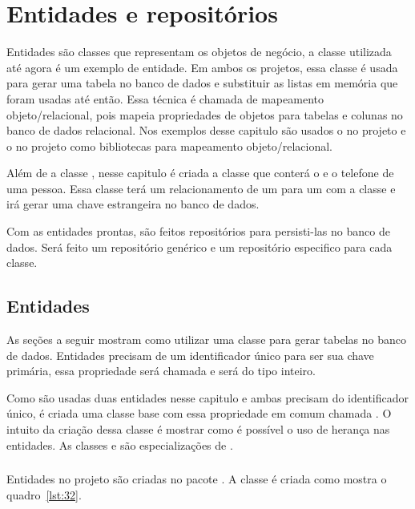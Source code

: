 \chapter{Entidades e repositórios}

Entidades são classes que representam os objetos de negócio, a classe  utilizada até agora é um exemplo de entidade. Em ambos os projetos, essa classe é usada para gerar uma tabela no banco de dados e substituir as listas em memória que foram usadas até então. Essa técnica é chamada de mapeamento objeto/relacional, pois mapeia propriedades de objetos para tabelas e colunas no banco de dados relacional. Nos exemplos desse capitulo são usados o  no projeto  e o  no projeto  como bibliotecas para mapeamento objeto/relacional.

Além de a classe , nesse capitulo é criada a classe  que conterá o  e o telefone de uma pessoa. Essa classe terá um relacionamento de um para um com a classe  e irá gerar uma chave estrangeira no banco de dados.

Com as entidades prontas, são feitos repositórios para persisti-las no banco de dados. Será feito um repositório genérico e um repositório especifico para cada classe.

\section{Entidades}

As seções a seguir mostram como utilizar uma classe para gerar tabelas no banco de dados. Entidades precisam de um identificador único para ser sua chave primária, essa propriedade será chamada  e será do tipo inteiro.

Como são usadas duas entidades nesse capitulo e ambas precisam do identificador único, é criada uma classe base com essa propriedade em comum chamada . O intuito da criação dessa classe é mostrar como é possível o uso de herança nas entidades. As classes  e  são especializações de .

\subsection{}

Entidades no projeto  são criadas no pacote . A classe  é criada como mostra o quadro~\ref{lst:32}.

